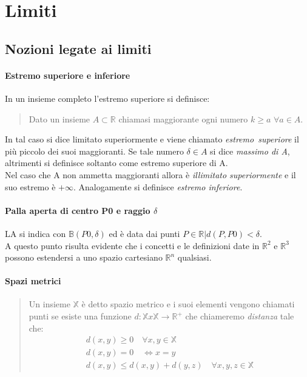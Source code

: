 \section{Limiti}
 
 \subsection{Nozioni legate ai limiti}
  
  \paragraph{Estremo superiore e inferiore}
  	In un insieme completo l'estremo superiore si definisce:
  	 \begin{quote}
  	  Dato un insieme $A \subset \mathbb{R}$ chiamasi maggiorante ogni numero $k\geq a$ $\forall a \in A$.
  	 \end{quote}
	In tal caso si dice limitato superiormente e viene chiamato \textit{estremo~superiore} il più piccolo dei suoi maggioranti. Se tale numero $\delta \in A$ si dice \textit{massimo di A}, altrimenti si definisce soltanto come estremo superiore di A.\\ Nel caso che A non ammetta maggioranti allora è \textit{illimitato superiormente} e il suo estremo è $+\infty$. Analogamente si definisce \textit{estremo inferiore}.
	
	\paragraph{Palla aperta di centro P0 e raggio $\delta$}
	LA si indica con $\mathbb{B}(P0,\delta)$ ed è data dai punti
	$P\in \mathbb{R}|d(P,P0)<\delta$.\\ A questo punto risulta evidente che i concetti e le definizioni date in $\mathbb{R}^{2}$ e $\mathbb{R}^{3}$ possono estendersi a uno spazio cartesiano $\mathbb{R}^{n}$ qualsiasi.
	
	\paragraph{Spazi metrici}
	 \begin{quote}
	  Un insieme $\mathbb{X}$ è detto spazio metrico e i suoi elementi vengono chiamati punti se esiste una funzione 
	  \textit{$d:\mathbb{X}x\mathbb{X}\to \mathbb{R}^{+}$} che chiameremo \textit{distanza} tale che:
	  \begin{gather}
	   d(x,y)\geq 0 \quad \forall x,y \in \mathbb{X}\\
	   d(x,y)=0 \quad \Leftrightarrow x=y\\
	   d(x,y)\leq d(x,y)+d(y,z) \quad \forall x,y,z\in \mathbb{X}
	  \end{gather}
	 \end{quote}
	
